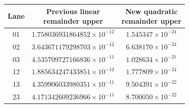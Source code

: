 \begin{tabular}{@{}c c c@{}}
\toprule
Lane & \shortstack{Previous linear\\remainder upper} & \shortstack{New quadratic\\remainder upper}\\
\midrule
01 & $1.758036931864852\times10^{-12}$ & $1.545347\times10^{-24}$ \\
02 & $3.643671179298703\times10^{-12}$ & $6.638170\times10^{-24}$ \\
03 & $4.535709727166836\times10^{-11}$ & $1.028634\times10^{-21}$ \\
12 & $1.885634247433851\times10^{-12}$ & $1.777809\times10^{-24}$ \\
13 & $4.359906033980351\times10^{-11}$ & $9.504391\times10^{-22}$ \\
23 & $4.171342609236966\times10^{-11}$ & $8.700050\times10^{-22}$ \\
\bottomrule
\end{tabular}

